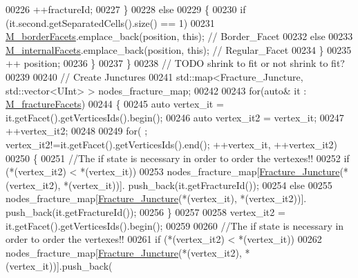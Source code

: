\begin{DoxyCode}
00226                 ++fractureId;
00227             \}
00228             \textcolor{keywordflow}{else}
00229             \{
00230                 \textcolor{keywordflow}{if} (it.second.getSeparatedCells().size() == 1)
00231                     \hyperlink{classFVCode3D_1_1Rigid__Mesh_a21700f8c7b816da944a829ee9d3ab7fb}{M\_borderFacets}.emplace\_back(position, \textcolor{keyword}{this}); \textcolor{comment}{// Border\_Facet}
00232                 \textcolor{keywordflow}{else}
00233                     \hyperlink{classFVCode3D_1_1Rigid__Mesh_a8ede7966973fec708327b95fc379a4e1}{M\_internalFacets}.emplace\_back(position, \textcolor{keyword}{this}); \textcolor{comment}{// Regular\_Facet}
00234             \}
00235             ++ position;
00236         \}
00237     \}
00238     \textcolor{comment}{// TODO shrink to fit or not shrink to fit?}
00239 
00240     \textcolor{comment}{// Create Junctures}
00241     std::map<Fracture\_Juncture, std::vector<UInt> > nodes\_fracture\_map;
00242 
00243     \textcolor{keywordflow}{for}(\textcolor{keyword}{auto}& it : \hyperlink{classFVCode3D_1_1Rigid__Mesh_acaff9da1f03f04f7012cf372f8f27cd6}{M\_fractureFacets})
00244     \{
00245         \textcolor{keyword}{auto} vertex\_it  = it.getFacet().getVerticesIds().begin();
00246         \textcolor{keyword}{auto} vertex\_it2 = vertex\_it;
00247         ++vertex\_it2;
00248 
00249         \textcolor{keywordflow}{for}( ; vertex\_it2!=it.getFacet().getVerticesIds().end(); ++vertex\_it, ++vertex\_it2)
00250         \{
00251             \textcolor{comment}{//The if state is necessary in order to order the vertexes!!}
00252             \textcolor{keywordflow}{if} (*(vertex\_it2) < *(vertex\_it))
00253                 nodes\_fracture\_map[\hyperlink{classFVCode3D_1_1Rigid__Mesh_a7c7beee55763889ef7a4d0bc48392084}{Fracture\_Juncture}(*(vertex\_it2), *(vertex\_it))].
      push\_back(it.getFractureId());
00254             \textcolor{keywordflow}{else}
00255                 nodes\_fracture\_map[\hyperlink{classFVCode3D_1_1Rigid__Mesh_a7c7beee55763889ef7a4d0bc48392084}{Fracture\_Juncture}(*(vertex\_it), *(vertex\_it2))].
      push\_back(it.getFractureId());
00256         \}
00257 
00258         vertex\_it2 = it.getFacet().getVerticesIds().begin();
00259 
00260         \textcolor{comment}{//The if state is necessary in order to order the vertexes!!}
00261         \textcolor{keywordflow}{if} (*(vertex\_it2) < *(vertex\_it))
00262             nodes\_fracture\_map[\hyperlink{classFVCode3D_1_1Rigid__Mesh_a7c7beee55763889ef7a4d0bc48392084}{Fracture\_Juncture}(*(vertex\_it2), *(vertex\_it))].push\_back(

\end{DoxyCode}
